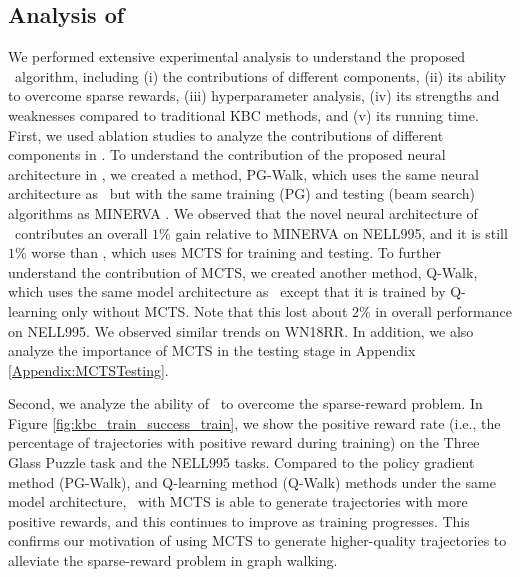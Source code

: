 \documentclass{article}
\begin{document}
	\subsection{Analysis of \modelname}
	We performed extensive experimental analysis to understand the proposed \modelname~algorithm, including (i) the contributions of different components, (ii) its ability to overcome sparse rewards, (iii) hyperparameter analysis, (iv) its strengths and weaknesses compared to traditional KBC methods, and (v) its running time. 
	First, we used ablation studies to analyze the contributions of different components in \modelname.	To understand the contribution of the proposed neural architecture in \modelname, we created a method, PG-Walk, which uses the same neural architecture as \modelname~but with the same training (PG) and testing (beam search) algorithms as MINERVA \cite{GoforaWalk}. We observed that the novel neural architecture of \modelname~contributes an overall $1\%$ gain relative to MINERVA on NELL995, and it is still $1\%$ worse than \modelname, which uses MCTS for training and testing. To further understand the contribution of MCTS, we created another method, Q-Walk, which uses the same model architecture as \modelname~except that it is trained by Q-learning only without MCTS. Note that this lost about $2\%$ in overall performance on NELL995. We observed similar trends on WN18RR. In addition, we also analyze the importance of MCTS in the testing stage in Appendix \ref{Appendix:MCTSTesting}.
	
	
	Second, we analyze the ability of \modelname~to overcome the sparse-reward problem. In Figure \ref{fig:kbc_train_success_train}, we show the positive reward rate (i.e., the percentage of trajectories with positive reward during training) on the Three Glass Puzzle task and the NELL995 tasks. Compared to the policy gradient method (PG-Walk), and Q-learning method (Q-Walk) methods under the same model architecture, \modelname~with MCTS is able to generate trajectories with more positive rewards, and this continues to improve as training progresses. This confirms our motivation of using MCTS to generate higher-quality trajectories to alleviate the sparse-reward problem in graph walking. 
	
\end{document}
